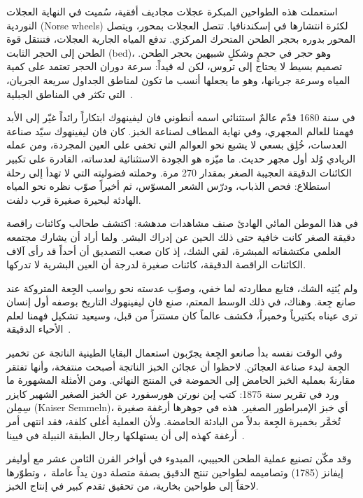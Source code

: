 استعملت هذه الطواحين المبكرة عجلات مجاديف أفقية، سُميت في النهاية العجلات النوردية \textenglish{(Norse wheels)} لكثرة انتشارها في إسكندنافيا. تتصل العجلات بمحور، ويتصل المحور بدوره بحجر الطحن المتحرك المركزي. تدفع المياه الجارية العجلات، فتنتقل قوة الطحن إلى الحجر الثابت \textenglish{(bed)}، وهو حجر في حجمٍ وشكلٍ شبيهين بحجر الطحن. تصميم بسيط لا يحتاج إلى تروس، لكن له قيداً: سرعة دوران الحجر تعتمد على كمية المياه وسرعة جريانها، وهو ما يجعلها أنسب ما تكون لمناطق الجداول سريعة الجريان، التي تكثر في المناطق الجبلية~\cite{mills+scandinavia}.

في سنة 1680 قدّم عالمٌ استثنائي اسمه أنطوني فان ليفينهوك ابتكاراً رائداً غيّر إلى الأبد فهمنا للعالم المجهري، وفي نهاية المطاف لصناعة الخبز. كان فان ليفينهوك سيّد صناعة العدسات، خُلِق بسعي لا يشبع نحو العوالم التي تخفى على العين المجردة، ومن عمله الريادي وُلد أول مجهر حديث. ما ميّزه هو الجودة الاستثنائية لعدساته، القادرة على تكبير الكائنات الدقيقة العجيبة الصغر بمقدار 270 مرة. وحملته فضوليته التي لا تهدأ إلى رحلة استطلاع: فحص الذباب، ودرّس الشعر المسوّس، ثم أخيراً صوّب نظره نحو المياه الهادئة لبحيرة صغيرة قرب دلفت.

في هذا الموطن المائي الهادئ صنف مشاهدات مدهشة: اكتشف طحالب وكائنات راقصة دقيقة الصغر كانت خافية حتى ذلك الحين عن إدراك البشر. ولما أراد أن يشارك مجتمعه العلمي مكتشفاته المبشرة، لقي الشك، إذ كان صعب التصديق أن أحداً قد رأى آلاف الكائنات الراقصة الدقيقة، كائنات صغيرة لدرجة أن العين البشرية لا تدركها.

ولم يُثنِه الشك، فتابع مطاردته لما خفي، وصوّب عدسته نحو رواسب الجِعة المتروكة عند صانع جِعة. وهناك، في ذلك الوسط المعتم، صنع فان ليفينهوك التاريخ بوصفه أول إنسان ترى عيناه بكتيرياً وخميراً، فكشف عالماً كان مستتراً من قبل، وسيعيد تشكيل فهمنا لعلم الأحياء الدقيقة~\cite{Yong+2017+Leeuwen}.

وفي الوقت نفسه بدأ صانعو الجِعة يجرّبون استعمال البقايا الطينية الناتجة عن تخمير الجِعة لبدء صناعة العجائن. لاحظوا أن عجائن الخبز الناتجة أصبحت منتفخة، وأنها تفتقر مقارنةً بعملية الخبز الحامض إلى الحموضة في المنتج النهائي. ومن الأمثلة المشهورة ما ورد في تقرير سنة 1875: كتب إبن نورتن هورسفورد عن الخبز الصغير الشهير كايزر سِمِلن \textenglish{(Kaiser Semmeln)}، أي خبز الإمبراطور الصغير. هذه في جوهرها أرغفة صغيرة تُخمَّر بخميرة الجِعة بدلاً من البادئة الحامضة. ولأن العملية أغلى كلفة، فقد انتهى أمر أرغفة كهذه إلى أن يستهلكها رجال الطبقة النبيلة في فيينا~\cite{vienna+breadrolls}.

وقد مكّن تصنيع عملية الطحن الحبيبي، المبدوء في أواخر القرن الثامن عشر مع أوليفر إيفانز (1785) وتصاميمه لطواحين تنتج الدقيق بصفة متصلة دون يداً عاملة~\cite{evans+mill}، وتطوّرها لاحقاً إلى طواحين بخارية، من تحقيق تقدم كبير في إنتاج الخبز.

